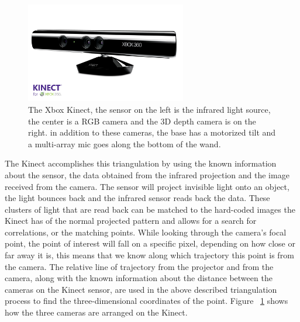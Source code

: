 \documentclass[12pt,twocolumn]{article}
\begin{document}
\begin{figure}[H]
\centering
\includegraphics[width=70mm]{kinect.jpg}
\caption{The Xbox Kinect, the sensor on the left is the infrared light source, the center is a RGB camera and the 3D depth camera is on the right. in addition to these cameras, the base has a motorized tilt and a multi-array mic goes along the bottom of the wand.}
\label{kinectlable}
\end{figure}
\indent  The Kinect accomplishes this triangulation by using the known information about the sensor, the data obtained from the infrared projection and the image received from the camera. The sensor will project invisible light onto an object, the light bounces back and the infrared sensor reads back the data. These clusters of light that are read back can be matched to the hard-coded images the Kinect has of the normal projected pattern and allows for a search for correlations, or the matching points. While looking through the camera's focal point, the point of interest will fall on a specific pixel, depending on how close or far away it is, this means that we know along which trajectory this point is from the camera. The relative line of trajectory from the projector and from the camera, along with the known information about the distance between the cameras on the Kinect sensor, are used in the above described triangulation process to find the three-dimensional coordinates of the point. Figure ~\ref{kinectlable} shows how the three cameras are arranged on the Kinect.
\end{document}
